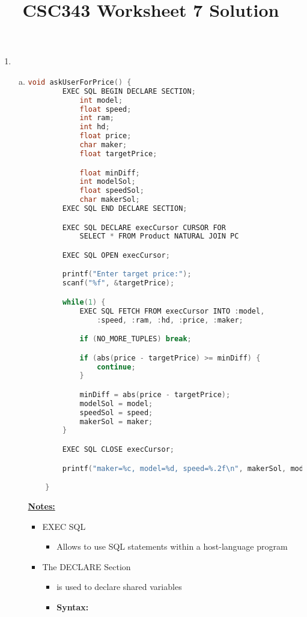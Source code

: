 \documentclass[12pt]{article}
\begin{document}
\title{CSC343 Worksheet 7 Solution}
\maketitle

\bigskip

\begin{enumerate}[1.]
    \item

    \begin{enumerate}[a)]
        \item
    \begin{lstlisting}[language=c]
    void askUserForPrice() {
        EXEC SQL BEGIN DECLARE SECTION;
            int model;
            float speed;
            int ram;
            int hd;
            float price;
            char maker;
            float targetPrice;

            float minDiff;
            int modelSol;
            float speedSol;
            char makerSol;
        EXEC SQL END DECLARE SECTION;

        EXEC SQL DECLARE execCursor CURSOR FOR
            SELECT * FROM Product NATURAL JOIN PC

        EXEC SQL OPEN execCursor;

        printf("Enter target price:");
        scanf("%f", &targetPrice);

        while(1) {
            EXEC SQL FETCH FROM execCursor INTO :model,
                :speed, :ram, :hd, :price, :maker;

            if (NO_MORE_TUPLES) break;

            if (abs(price - targetPrice) >= minDiff) {
                continue;
            }

            minDiff = abs(price - targetPrice);
            modelSol = model;
            speedSol = speed;
            makerSol = maker;
        }

        EXEC SQL CLOSE execCursor;

        printf("maker=%c, model=%d, speed=%.2f\n", makerSol, modelSol, speedSol);

    }
    \end{lstlisting}

        \bigskip

        \underline{\textbf{Notes:}}

        \bigskip

        \begin{itemize}
            \item EXEC SQL
            \begin{itemize}
                \item Allows to use SQL statements within a host-language program
            \end{itemize}
            \item The DECLARE Section
            \begin{itemize}
                \item is used to declare shared variables
                \item \textbf{Syntax:}


\end{itemize}
\end{itemize}
\end{enumerate}
\end{enumerate}
\end{document}

